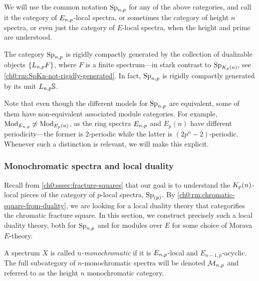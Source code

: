 \begin{notation}
    We will use the common notation $\mathrm{Sp}_{n,p}$ for any of the above categories, and call it the category of $E_{n,p}$-local spectra, or sometimes the category of height $n$ spectra, or even just the category of $E$-local spectra, when the height and prime are understood. 
\end{notation}

\begin{remark}
    The category $\mathrm{Sp}_{n,p}$ is rigidly compactly generated by the collection of dualizable objects $\{L_{n,p} F\}$, where $F$ is a finite spectrum---in stark contrast to $\mathrm{Sp}_{{K_p(n)}}$, see \cref{ch0:rm:SpKn-not-rigidly-generated}. In fact, $\mathrm{Sp}_{n,p}$ is rigidly compactly generated by its unit $L_{n,p}\mathbb{S}$. 
\end{remark}

\begin{remark}
    Note that even though the different models for $\mathrm{Sp}_{n,p}$ are equivalent, some of them have non-equivalent associated module categories. For example, $\mathrm{Mod}_{E_{n,p}}\not \simeq \mathrm{Mod}_{E_p(n)}$, as the ring spectra $E_{n,p}$ and $E_p(n)$ have different periodicity---the former is $2$-periodic while the latter is $(2p^n-2)$-periodic. Whenever such a distinction is relevant, we will make this explicit. 
\end{remark}





\subsubsection{Monochromatic spectra and local duality}
\label{ch0:sssec:monochromatic-duality}

Recall from \cref{ch0:sssec:fracture-squares} that our goal is to understand the ${K_p(n)}$-local pieces of the category of $p$-local spectra, $\mathrm{Sp}_{(p)}$. By \cref{ch0:rm:chromatic-square-from-duality}, we are looking for a local duality theory that categorifies the chromatic fracture square. In this section, we construct precisely such a local duality theory, both for $\mathrm{Sp}_{n,p}$ and for modules over $E$ for some choice of Morava $E$-theory. 



\begin{definition}
    \label{ch0:def:monochromatic-spectrum}
    A spectrum $X$ is called \emph{$n$-monochromatic} if it is $E_{n,p}$-local and $E_{n-1,p}$-acyclic. The full subcategory of $n$-monochromatic spectra will be denoted $\mathcal{M}_{n,p}$ and referred to as the height $n$ monochromatic category.
\end{definition}

